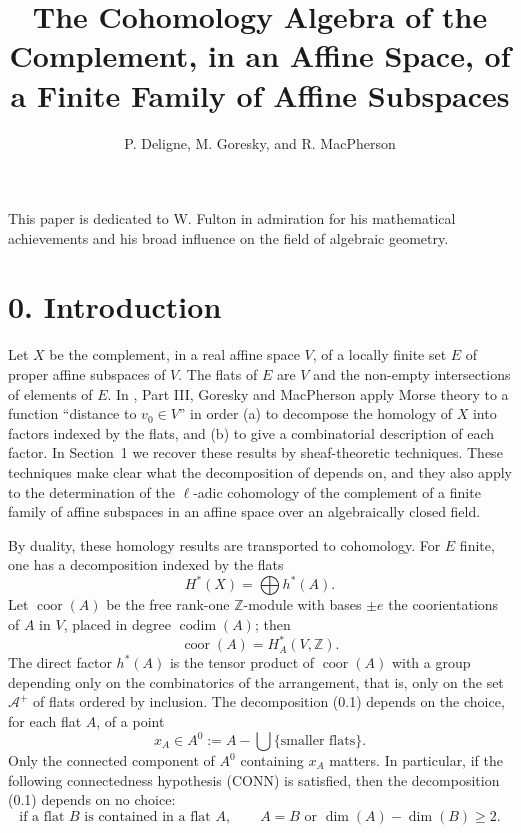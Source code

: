\documentclass[11pt]{article}
\title{The Cohomology Algebra of the Complement, in an Affine Space, of a Finite Family of Affine Subspaces}
\author{P. Deligne, M. Goresky, and R. MacPherson}
\date{}
\theoremstyle{definition}
\newcommand{\ZZ}{\mathbb Z}
\newcommand{\codim}{\operatorname{codim}}
\newcommand{\coor}{\operatorname{coor}}
\begin{document}
\maketitle

This paper is dedicated to W. Fulton in admiration for his mathematical achievements and his broad influence on the field of algebraic geometry.

\section*{0. Introduction}

Let $X$ be the complement, in a real affine space $V$, of a locally finite set $E$ of proper affine subspaces of $V$.  The flats of $E$ are $V$ and the non-empty intersections of elements of $E$.  In \cite{GM}, Part III, Goresky and MacPherson apply Morse theory to a function ``distance to $v_0\in V$'' in order (a) to decompose the homology of $X$ into factors indexed by the flats, and (b) to give a combinatorial description of each factor.  In Section~1 we recover these results by sheaf-theoretic techniques.  These techniques make clear what the decomposition of \cite{GM} depends on, and they also apply to the determination of the $\ell$-adic cohomology of the complement of a finite family of affine subspaces in an affine space over an algebraically closed field.

By duality, these homology results are transported to cohomology.  For $E$ finite, one has a decomposition indexed by the flats
\begin{equation}
H^*(X)=\bigoplus h^*(A). \tag{0.1}
\end{equation}
Let $\coor(A)$ be the free rank-one $\ZZ$-module with bases $\pm e$ the coorientations of $A$ in $V$, placed in degree $\codim(A)$; then
\begin{equation}
\coor(A)=H_A^*(V,\ZZ). \tag{0.2}
\end{equation}
The direct factor $h^*(A)$ is the tensor product of $\coor(A)$ with a group depending only on the combinatorics of the arrangement, that is, only on the set $\mathcal A^+$ of flats ordered by inclusion.  The decomposition (0.1) depends on the choice, for each flat $A$, of a point
\[
 x_A\in A^0:=A-\bigcup\{\text{smaller flats}\}.
\]
Only the connected component of $A^0$ containing $x_A$ matters.  In particular, if the following connectedness hypothesis \textup{(CONN)} is satisfied, then the decomposition (0.1) depends on no choice:
\begin{equation*}
\text{if a flat } B \text{ is contained in a flat } A,
\qquad A=B \text{ or } \dim(A)-\dim(B)\geq 2.\tag{CONN}
\end{equation*}
\end{document}
